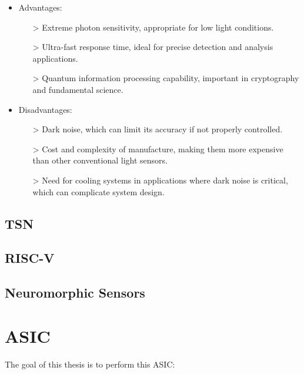 \begin{itemize}
\item Advantages:
    \begin{itemize}
    \item[>] Extreme photon sensitivity, appropriate for low light conditions.
    \item[>] Ultra-fast response time, ideal for precise detection and analysis applications.
    \item[>] Quantum information processing capability, important in cryptography and fundamental science.
    \end{itemize}
\item Disadvantages:
    \begin{itemize}
    \item[>] Dark noise, which can limit its accuracy if not properly controlled.
    \item[>] Cost and complexity of manufacture, making them more expensive than other conventional light sensors.
    \item[>] Need for cooling systems in applications where dark noise is critical, which can complicate system design.
    \end{itemize}
\end{itemize}

\subsection{TSN}

\subsection{RISC-V}

\subsection{Neuromorphic Sensors}

\newpage

\section{ASIC}

The goal of this thesis is to perform this ASIC:

